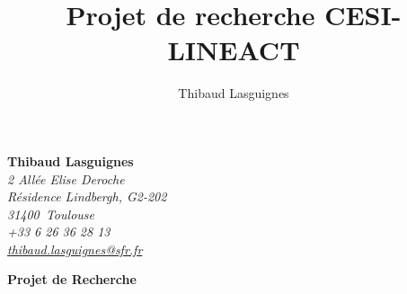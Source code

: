 \documentclass[a4paper, french, 10pt, onecolumn, notitlepage, roman]{article}
\title{Projet de recherche CESI-LINEACT}
\author{Thibaud Lasguignes}
\makeatletter
\newcommand{\nom}{Thibaud Lasguignes}
\newcommand{\adresse}{2 Allée Elise Deroche}
\newcommand{\adressecplt}{Résidence Lindbergh, G2-202}
\newcommand{\codepostal}{31400}
\newcommand{\ville}{Toulouse}
\newcommand{\telephone}{+33 6 26 36 28 13}
\newcommand{\email}{thibaud.lasguignes@sfr.fr}
\newcommand{\customheader}{
    \raggedleft
    \textcolor{moderncvgray}{\textbf{\nom}} \\
    \textcolor{moderncvgray}{\textsl{\small\adresse}} \\
    \textcolor{moderncvgray}{\textsl{\small\adressecplt}} \\
    \textcolor{moderncvgray}{\textsl{\small\codepostal~\ville}} \\
    \textcolor{moderncvgray}{\textsl{\small\telephone}} \\
    \textcolor{moderncvgray}{\textsl{\small\href{mailto:\email}{\email}}} \\
}
\makeatother
\begin{document}
\date{}
\customheader

\centering

\vspace{2em}
{\Large\textbf{Projet de Recherche}}

\justifying


\end{document}
